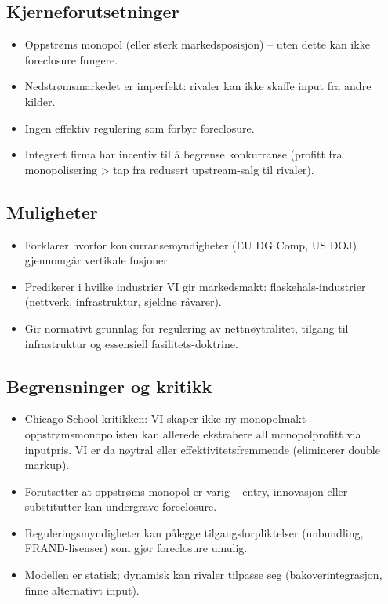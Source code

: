 \subsection*{Kjerneforutsetninger}
\begin{itemize}
\item Oppstrøms monopol (eller sterk markedsposisjon) -- uten dette kan ikke foreclosure fungere.
\item Nedstrømsmarkedet er imperfekt: rivaler kan ikke skaffe input fra andre kilder.
\item Ingen effektiv regulering som forbyr foreclosure.
\item Integrert firma har incentiv til å begrense konkurranse (profitt fra monopolisering > tap fra redusert upstream-salg til rivaler).
\end{itemize}

\subsection*{Muligheter}
\begin{itemize}
\item Forklarer hvorfor konkurransemyndigheter (EU DG Comp, US DOJ) gjennomgår vertikale fusjoner.
\item Predikerer i hvilke industrier VI gir markedsmakt: flaskehals-industrier (nettverk, infrastruktur, sjeldne råvarer).
\item Gir normativt grunnlag for regulering av nettnøytralitet, tilgang til infrastruktur og essensiell fasilitets-doktrine.
\end{itemize}

\subsection*{Begrensninger og kritikk}
\begin{itemize}
\item Chicago School-kritikken: VI skaper ikke ny monopolmakt -- oppstrømsmonopolisten kan allerede ekstrahere all monopolprofitt via inputpris. VI er da nøytral eller effektivitetsfremmende (eliminerer double markup).
\item Forutsetter at oppstrøms monopol er varig -- entry, innovasjon eller substitutter kan undergrave foreclosure.
\item Reguleringsmyndigheter kan pålegge tilgangsforpliktelser (unbundling, FRAND-lisenser) som gjør foreclosure umulig.
\item Modellen er statisk; dynamisk kan rivaler tilpasse seg (bakoverintegrasjon, finne alternativt input).
\end{itemize}

